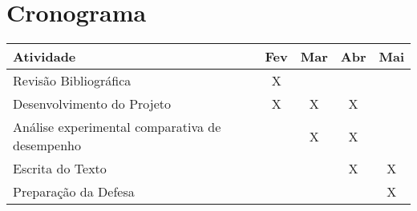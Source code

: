 \section{Cronograma}

\begin{center}
	\begin{tabular}{|l||c||c||c||c|}
		\hline
		Atividade &Fev &Mar &Abr &Mai\\
		\hline
		Revisão Bibliográfica &X & & &\\
		\hline
		Desenvolvimento do Projeto &X &X &X &\\
		\hline
		Análise experimental comparativa de desempenho& &X &X &\\
		\hline
		Escrita do Texto & & &X &X\\
		\hline
		Preparação da Defesa & & & &X\\
		\hline
	\end{tabular}\\
\end{center}
